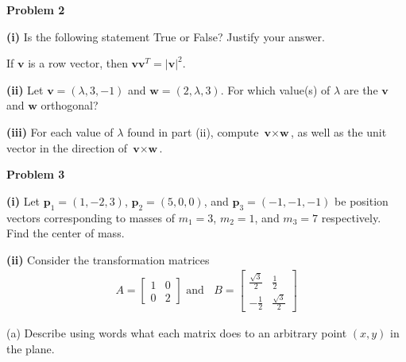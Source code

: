 \documentclass[12pt]{amsbook}
\begin{document}
\newpage

\textbf{Problem 2}

\vspace{.25cm}

\textbf{(i)} Is the following statement True or False? Justify your answer.
\begin{center}
If $\textbf{v}$ is a row vector, then $\textbf{v}\textbf{v}^T = |\textbf{v}|^2$.
\end{center}

\vspace{4cm}


\textbf{(ii)} Let $\textbf{v} = (\lambda,3,-1)$ and $\textbf{w} = (2,\lambda,3)$. For which value(s) of $\lambda$ are the $\textbf{v}$ and $\textbf{w}$ orthogonal?



\vspace{4cm}

\textbf{(iii)} For each value of $\lambda$ found in part (ii), compute $\textbf{v}\times\textbf{w}$, as well as the unit vector in the direction of $\textbf{v}\times\textbf{w}$.







\newpage

\textbf{Problem 3}

\vspace{.25cm}

\textbf{(i)} Let $\textbf{p}_1 = (1,-2,3)$, $\textbf{p}_2 = (5,0,0)$, and $\textbf{p}_3=(-1,-1,-1)$ be position vectors corresponding to masses of $m_1=3$, $m_2=1$, and $m_3=7$ respectively. Find the center of mass.


\vspace{4cm}

\textbf{(ii)} Consider the transformation matrices 
\begin{align*}A=\left[\begin{array}{cc} 1 & 0 \\ 0 & 2\end{array}\right] \text{ and }\;\; B=\left[\begin{array}{cc} \frac{\sqrt{3}}{2} & \frac{1}{2}\\ -\frac{1}{2} & \frac{\sqrt{3}}{2}\end{array}\right]
\end{align*}

(a) Describe using words what each matrix does to an arbitrary point $(x,y)$ in the plane.
\end{document}
